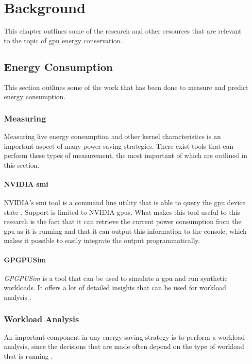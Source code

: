 \chapter{Background}
	This chapter outlines some of the research and other resources that are relevant to the topic of \gls{gpu} energy conservation.

	\section{Energy Consumption}
		This section outlines some of the work that has been done to measure and predict energy consumption.

		\subsection{Measuring}
			Measuring live energy consumption and other kernel characteristics is an important aspect of many power saving strategies.
			There exist tools that can perform these types of measurement, the most important of which are outlined in this section.

			\subsubsection{NVIDIA \acrlong{smi}}
				NVIDIA's \gls{smi} tool is a command line utility that is able to query the \gls{gpu} device state \parencite{NVIDIA}.
				Support is limited to NVIDIA \glspl{gpu}.
				What makes this tool useful to this research is the fact that it can retrieve the current power consumption from the \gls{gpu} as it is running and that it can output this information to the console, which makes it possible to easily integrate the output programmatically.

			\subsubsection{GPGPUSim}
				\emph{GPGPUSim} is a tool that can be used to simulate a \gls{gpu} and run synthetic workloads.
				It offers a lot of detailed insights that can be used for workload analysis \parencite{Bakhoda2009}.

		\subsection{Workload Analysis}
			An important component in any energy saving strategy is to perform a workload analysis, since the decisions that are made often depend on the type of workload that is running \parencite{Chen2011}.

